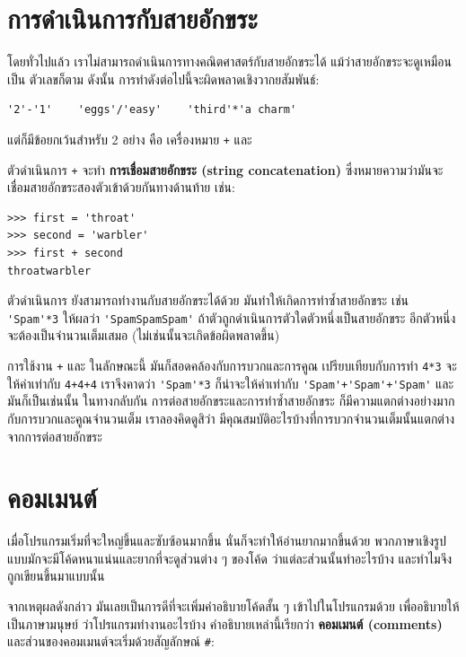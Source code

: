 \section{การดำเนินการกับสายอักขระ } %

โดยทั่วไปแล้ว เราไม่สามารถดำเนินการทางคณิตศาสตร์กับสายอักขระได้ แม้ว่าสายอักขระจะดูเหมือนเป็น
ตัวเลขก็ตาม  ดังนั้น การทำดังต่อไปนี้จะผิดพลาดเชิงวากยสัมพันธ์:

\begin{verbatim}
'2'-'1'    'eggs'/'easy'    'third'*'a charm'
\end{verbatim}
%
แต่ก็มีข้อยกเว้นสำหรับ 2 อย่าง คือ เครื่องหมาย {\tt +} และ {\tt *}

ตัวดำเนินการ {\tt +} จะทำ {\bf การเชื่อมสายอักขระ (string concatenation)} 
ซึ่งหมายความว่ามันจะเชื่อมสายอักขระสองตัวเข้าด้วยกันทางด้านท้าย เช่น:

\begin{verbatim}
>>> first = 'throat'
>>> second = 'warbler'
>>> first + second
throatwarbler
\end{verbatim}
%
ตัวดำเนินการ {\tt *} ยังสามารถทำงานกับสายอักขระได้ด้วย มันทำให้เกิดการทำซ้ำสายอักขระ เช่น 
\verb"'Spam'*3" ให้ผลว่า \verb"'SpamSpamSpam'" ถ้าตัวถูกดำเนินการตัวใดตัวหนึ่งเป็นสายอักขระ 
อีกตัวหนึ่งจะต้องเป็นจำนวนเต็มเสมอ (ไม่เช่นนั้นจะเกิดข้อผิดพลาดขึ้น) 

การใช้งาน {\tt +} และ {\tt *} ในลักษณะนี้ มันก็สอดคล้องกับการบวกและการคูณ
เปรียบเทียบกับการทำ {\tt 4*3} จะให้ค่าเท่ากับ {\tt 4+4+4} เราจึงคาดว่า \verb"'Spam'*3" 
ก็น่าจะให้ค่าเท่ากับ \verb"'Spam'+'Spam'+'Spam'" และมันก็เป็นเช่นนั้น  ในทางกลับกัน 
การต่อสายอักขระและการทำซ้ำสายอักขระ ก็มีความแตกต่างอย่างมากกับการบวกและคูณจำนวนเต็ม
เราลองคิดดูสิว่า มีคุณสมบัติอะไรบ้างที่การบวกจำนวนเต็มนั้นแตกต่างจากการต่อสายอักขระ


\section{คอมเมนต์ } %

เมื่อโปรแกรมเริ่มที่จะใหญ่ขึ้นและซับซ้อนมากขึ้น นั่นก็จะทำให้อ่านยากมากขึ้นด้วย  
พวกภาษาเชิงรูปแบบมักจะมีโค้ดหนาแน่นและยากที่จะดูส่วนต่าง ๆ ของโค้ด 
ว่าแต่ละส่วนนั้นทำอะไรบ้าง และทำไมจึงถูกเขียนขึ้นมาแบบนั้น

จากเหตุผลดังกล่าว มันเลยเป็นการดีที่จะเพิ่มคำอธิบายโค้ดสั้น ๆ เข้าไปในโปรแกรมด้วย 
เพื่ออธิบายให้เป็นภาษามนุษย์ ว่าโปรแกรมทำงานอะไรบ้าง คำอธิบายเหล่านี้เรียกว่า 
{\bf คอมเมนต์ (comments)} และส่วนของคอมเมนต์จะเริ่มด้วยสัญลักษณ์ \verb"#":

